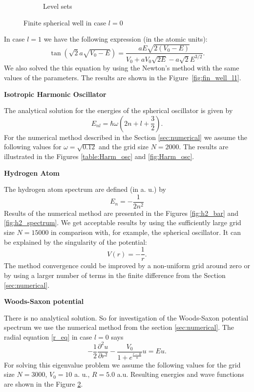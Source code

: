 \documentclass[a4paper, 14pt]{article}
\begin{document}
\begin{figure}[h!]
\begin{subfigure}{.5\textwidth}
  \caption{Level sets}
  \label{fig:wave_func}
\end{subfigure}
\caption{Finite spherical well in case $l=0$}
\label{fig:WS_potential}
\end{figure}

In case $l=1$ we have the following expression (in the atomic units):
$$\tan(\sqrt{2} a \sqrt{V_0-E}) = \frac{a E \sqrt{2(V_0 - E)}}{V_0+a V_0 \sqrt{2E} -a \sqrt{2} E^{3/2}}.$$
We also solved the this equation by using the Newton's method with the same values of the parameters. The results are shown in the Figure~\ref{fig:fin_well_l1}.

\begin{center}
		\large
		\textbf{Isotropic Harmonic Oscillator}		\\[0.5 cm]
\end{center}
The analytical solution for the energies of the spherical oscillator is given by
$$E_{nl} = \hbar \omega (2 n +l+\frac{3}{2}).$$
For the numerical method described in the Section \ref{sec:numerical} we assume the following values for $\omega = \sqrt{0.12}$ and the grid size $N = 2000.$ The results are illustrated in the Figures \ref{table:Harm_osc} and \ref{fig:Harm_osc}.

\begin{center}
		\large
		\textbf{Hydrogen Atom}		\\[0.5 cm]
\end{center}
The hydrogen atom spectrum are defined (in a. u.) by 
$$E_n = -\frac{1}{2 n^2}$$
Results of the numerical method are presented in the Figures \ref{fig:h2_bar} and \ref{fig:h2_spectrum}. We get acceptable results by using the sufficiently large grid size $N = 15000$ in comparison with, for example, the spherical oscillator. It can be explained by the singularity of the potential:
$$V(r) = -\frac{1}{r}.$$
The method convergence could be improved by a non-uniform grid around zero or by using a larger number of terms in the finite difference from the Section \ref{sec:numerical}.

\begin{center}
		\large
		\textbf{Woods-Saxon potential}		\\[0.5 cm]
\end{center}
There is no analytical solution. So for investigation of the Woods-Saxon potential spectrum we use the numerical method from the section \ref{sec:numerical}. The radial equation \eqref{r_eq} in case $l=0$ says 
$$-\frac{1}{2}\frac{\partial^2 u}{\partial r^2 }- \frac{V_0}{1+e^\frac{r-R}{a}}u = Eu.$$
For solving this eigenvalue problem we assume the following values for the grid size $N = 3000$,  $V_0 = 10$ a. u., $R = 5.0$ a.u. Resulting energies and wave functions are shown in the Figure \ref{fig:WS_potential}.
\end{document}
